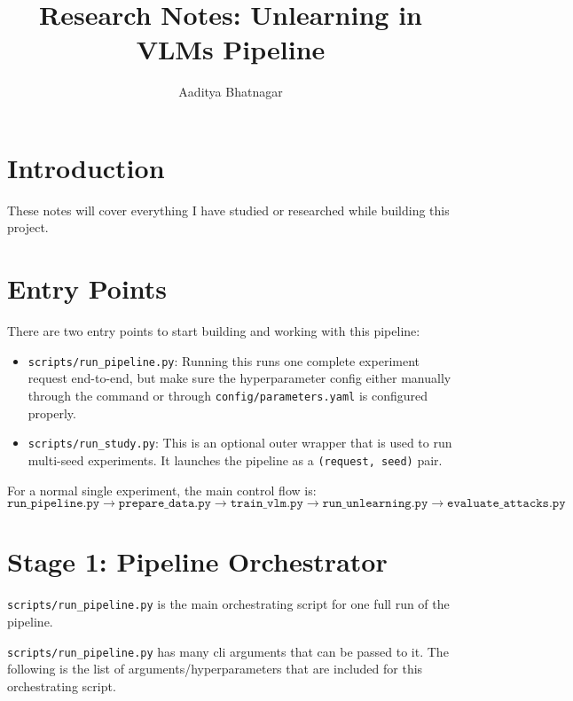 \documentclass[10pt,a4paper]{article}
\title{Research Notes: Unlearning in VLMs Pipeline}
\author{Aaditya Bhatnagar}
\date{}
\begin{document}
\maketitle

\section{Introduction}
These notes will cover everything I have studied or researched while building this project.

\section{Entry Points}
There are two entry points to start building and working with this pipeline:
\begin{itemize}
  \item \texttt{scripts/run\_pipeline.py}: 
  Running this runs one complete experiment request end-to-end, but make sure the hyperparameter config either manually through the command or through \texttt{config/parameters.yaml} is configured properly.
  \item \texttt{scripts/run\_study.py}: 
  This is an optional outer wrapper that is used to run multi-seed experiments. It launches the pipeline as a \texttt{(request, seed)} pair.
\end{itemize}

For a normal single experiment, the main control flow is:
\[
\texttt{run\_pipeline.py}
\rightarrow
\texttt{prepare\_data.py}
\rightarrow
\texttt{train\_vlm.py}
\rightarrow
\texttt{run\_unlearning.py}
\rightarrow
\texttt{evaluate\_attacks.py}
\]

\section{Stage 1: Pipeline Orchestrator}
\texttt{scripts/run\_pipeline.py} is the main orchestrating script for one full run of the pipeline. 

\texttt{scripts/run\_pipeline.py} has many cli arguments that can be passed to it. The following is the list of arguments/hyperparameters that are included for this orchestrating script. 
\end{document}
